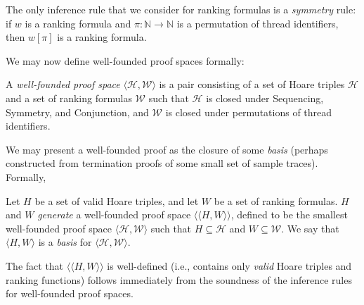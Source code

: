 \documentclass[9pt,nocopyrightspace]{sigplanconf}
\theoremstyle{definition}
\newcommand{\tuple}[1]{\langle #1 \rangle}
\newcommand{\rankformulas}{\mathscr{W}}
\newcommand{\closure}[1]{\langle\!\langle#1\rangle\!\rangle}
\begin{document}
The only inference rule that we consider for ranking formulas is a
\emph{symmetry} rule: if $w$ is a ranking formula and $\pi : \mathbb{N}
\rightarrow \mathbb{N}$ is a permutation of thread identifiers, then
$w[\pi]$ is a ranking formula.

We may now define well-founded proof spaces formally:
\begin{definition}
  A \emph{well-founded proof space} $\tuple{\mathscr{H},\rankformulas}$ is a
  pair consisting of a set of Hoare triples $\mathscr{H}$ and a set of ranking
  formulas $\rankformulas$ such that $\mathscr{H}$ is closed under {\sc
    Sequencing}, {\sc Symmetry}, and {\sc Conjunction}, and $\rankformulas$ is
  closed under permutations of thread identifiers.
\end{definition}




















We may present a well-founded proof as the closure of some \emph{basis}
(perhaps constructed from termination proofs of some small set of sample
traces).  Formally,
\begin{definition}  \label{def:basis}
Let $H$ be a set of valid Hoare triples, and let $W$ be a set of ranking
formulas.  $H$ and $W$ \emph{generate} a well-founded proof space
$\closure{H,W}$, defined to be the smallest well-founded proof space
$\tuple{\mathscr{H},\mathscr{W}}$ such that $H \subseteq \mathscr{H}$ and $W
\subseteq \mathscr{W}$.  We say that $\tuple{H,W}$ is a \emph{basis} for
$\tuple{\mathscr{H},\mathscr{W}}$.
\end{definition}
The fact that $\closure{H,W}$ is well-defined (i.e., contains only
\emph{valid} Hoare triples and ranking functions) follows immediately from the
soundness of the inference rules for well-founded proof spaces.
\end{document}
